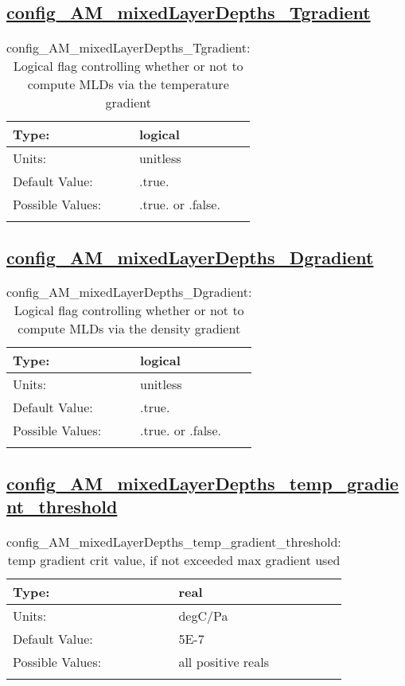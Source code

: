 \subsection[config\_AM\_mixedLayerDepths\_Tgradient]{\hyperref[sec:nm_tab_AM_mixedLayerDepths]{config\_AM\_mixedLayerDepths\_Tgradient}}
\label{subsec:nm_sec_config_AM_mixedLayerDepths_Tgradient}
\begin{center}
\begin{longtable}{| p{2.0in} || p{4.0in} |}
    \hline
    Type: & logical \\
    \hline
    Units: & \si{unitless} \\
    \hline
    Default Value: & .true. \\
    \hline
    Possible Values: & .true. or .false. \\
    \hline
    \caption{config\_AM\_mixedLayerDepths\_Tgradient: Logical flag controlling whether or not to compute MLDs via the temperature gradient}
\end{longtable}
\end{center}
\subsection[config\_AM\_mixedLayerDepths\_Dgradient]{\hyperref[sec:nm_tab_AM_mixedLayerDepths]{config\_AM\_mixedLayerDepths\_Dgradient}}
\label{subsec:nm_sec_config_AM_mixedLayerDepths_Dgradient}
\begin{center}
\begin{longtable}{| p{2.0in} || p{4.0in} |}
    \hline
    Type: & logical \\
    \hline
    Units: & \si{unitless} \\
    \hline
    Default Value: & .true. \\
    \hline
    Possible Values: & .true. or .false. \\
    \hline
    \caption{config\_AM\_mixedLayerDepths\_Dgradient: Logical flag controlling whether or not to compute MLDs via the density gradient}
\end{longtable}
\end{center}
\subsection[config\_AM\_mixedLayerDepths\_temp\_gradient\_threshold]{\hyperref[sec:nm_tab_AM_mixedLayerDepths]{config\_AM\_mixedLayerDepths\_temp\_gradient\_threshold}}
\label{subsec:nm_sec_config_AM_mixedLayerDepths_temp_gradient_threshold}
\begin{center}
\begin{longtable}{| p{2.0in} || p{4.0in} |}
    \hline
    Type: & real \\
    \hline
    Units: & \si{degC/Pa} \\
    \hline
    Default Value: & 5E-7 \\
    \hline
    Possible Values: & all positive reals \\
    \hline
    \caption{config\_AM\_mixedLayerDepths\_temp\_gradient\_threshold: temp gradient crit value, if not exceeded max gradient used}
\end{longtable}
\end{center}
